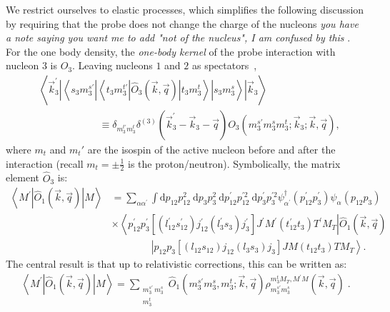 \documentclass[a4paper,11pt]{article}
\newcommand\bv[1]{\vec{#1}}
\newcommand{\ques}[1]{\color{red}\textit{ #1 }\color{black}}
\begin{document}
We restrict ourselves to elastic processes, which simplifies the
following discussion by requiring that the probe does not change the
charge of the nucleons \ques{you have a note saying you want me to add "not of the nucleus", I am confused by this}.
For the one body density, the \textit{one-body kernel} of the probe
interaction with nucleon 3 is $O_3$. Leaving nucleons $1$ and $2$ as
spectators~\cite{hammer2020},
\begin{align}
  &\left\langle\bv{k}_{3}^{\prime}\left|\left\langle s_{3} m_{3}^{s
  \prime}\left|\left\langle t_{3} m_{3}^{t
  \prime}\left|\hat{O}_{3}(\bv{k}, \bv{q})\right| t_{3}
  m_{3}^{t}\right\rangle\right| s_{3} m_{3}^{s}\right\rangle\right|
  \bv{k}_{3}\right\rangle \nonumber\\
  &\qquad\qquad\qquad \equiv \delta_{m_{3}^{t \prime} m_{3}^{t}}
  \delta^{(3)}\left(\bv{k}_{3}^{\prime}-\bv{k}_{3}-\bv{q}\right)
  O_{3}\left(m_{3}^{s \prime} m_{3}^{s} m_{3}^{t} ; \bv{k}_{3} ;
  \bv{k}, \bv{q}\right),\label{dirac}
\end{align}
where $m_t$ and $m_t'$ are the isospin of the active nucleon before
and after the interaction (recall $m_t= \pm \frac{1}{2}$ is the proton/neutron).
Symbolically, the matrix element $\hat{O}_3$ is:
\begin{align}
  \left\langle M^{\prime}\left|\hat{O}_{1}(\bv{k}, \bv{q})\right|
  M\right\rangle&=\sum_{\alpha \alpha^{\prime}} \int \mathrm{d}
  p_{12} p_{12}^{2} \mathrm{~d} p_{3} p_{3}^{2} \mathrm{~d}
  p_{12}^{\prime} p_{12}^{\prime 2} \mathrm{~d} p_{3}^{\prime}
  p_{3}^{\prime 2}
  \psi_{\alpha^{\prime}}^{\dagger}\left(p_{12}^{\prime}
  p_{3}^{\prime}\right) \psi_{\alpha}\left(p_{12} p_{3}\right)\nonumber \\
  &\times\left\langle p_{12}^{\prime}
  p_{3}^{\prime}\left[\left(l_{12}^{\prime} s_{12}^{\prime}\right)
    j_{12}^{\prime}\left(l_{3}^{\prime} s_{3}\right)
  j_{3}^{\prime}\right] J^{\prime} M^{\prime}\left(t_{12}^{\prime}
  t_{3}\right) T^{\prime} M_{T}\right| \hat{O}_{1}(\bv{k}, \bv{q})
  \label{onebodFull}\\
  &\qquad\qquad\left|p_{12} p_{3}\left[\left(l_{12} s_{12}\right)
  j_{12}\left(l_{3} s_{3}\right) j_{3}\right] J M\left(t_{12}
t_{3}\right) T M_{T}\right\rangle.\nonumber
\end{align}
The central result is that up to relativistic corrections, this can
be written as:
\begin{align}
  \left\langle M^{\prime}\left|\hat{O}_{1}(\bv{k}, \bv{q})\right|
  M\right\rangle=\sum_{\substack{m_{3}^{s \prime}\,
  m_{3}^{s}\\m_3^t}}\hat{O}_{1}\left(m_{3}^{s \prime} m_{3}^{s},
  m_{3}^{t} ;  \bv{k}, \bv{q}\right) \rho_{m_{3}^{s \prime}
  m_{3}^{s}}^{m_3^{t} M_{T}, M^{\prime} M}(\bv{k}, \bv{q})\label{onebodyOrig}\;.
\end{align}
\end{document}
